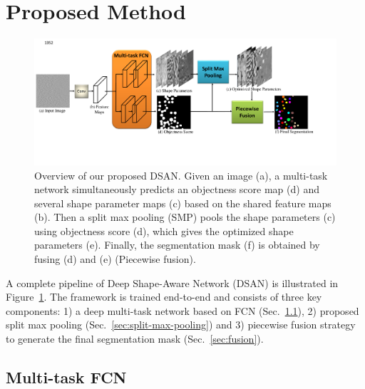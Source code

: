 \section{Proposed Method}
\label{sec:method}
\begin{figure}
    \begin{center}
        \includegraphics[width=6.7in]{figures/FigDSAN.pdf}
    \end{center}
    \caption{Overview of our proposed DSAN. Given an image (a), a multi-task network simultaneously predicts an objectness score map (d) and several shape parameter maps (c) based on the shared feature maps (b).
    Then a split max pooling (SMP) pools the shape parameters (c) using objectness score (d), which gives the optimized shape parameters (e).
    Finally, the segmentation mask (f) is obtained by fusing (d) and (e) (Piecewise fusion).}
    \label{FigDSAN}
\end{figure}

A complete pipeline of Deep Shape-Aware Network (DSAN) is illustrated in Figure~\ref{FigDSAN}.
The framework is trained end-to-end and consists of three key components:
1) a deep multi-task network based on FCN (Sec.~\ref{sec:multi-task-fcn}),
2) proposed split max pooling (Sec.~\ref{sec:split-max-pooling}) and
3) piecewise fusion strategy to generate the final segmentation mask (Sec.~\ref{sec:fusion}).

\subsection{Multi-task FCN}
\label{sec:multi-task-fcn}

